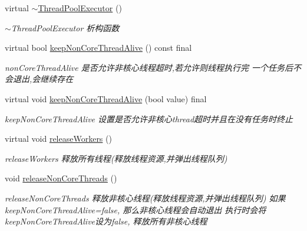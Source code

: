 \begin{DoxyCompactItemize}
\mbox{\label{classThreadPoolExecutor_a1d5a1c3330593f243959256d32068c15}} 
virtual \hyperlink{classThreadPoolExecutor_a1d5a1c3330593f243959256d32068c15}{$\sim$\+Thread\+Pool\+Executor} ()
\begin{DoxyCompactList}\small\item\em $\sim$\+Thread\+Pool\+Executor 析构函数 \end{DoxyCompactList}\item 
virtual bool \hyperlink{classThreadPoolExecutor_ac2aa11f7cde6e6082eb0dde8f2385dce}{keep\+Non\+Core\+Thread\+Alive} () const final
\begin{DoxyCompactList}\small\item\em non\+Core\+Thread\+Alive 是否允许非核心线程超时,若允许则线程执行完 一个任务后不会退出,会继续存在 \end{DoxyCompactList}\item 
virtual void \hyperlink{classThreadPoolExecutor_a7e6ed2d088147377d1e82018ac3dac1d}{keep\+Non\+Core\+Thread\+Alive} (bool value) final
\begin{DoxyCompactList}\small\item\em keep\+Non\+Core\+Thread\+Alive 设置是否允许非核心thread超时并且在没有任务时终止 \end{DoxyCompactList}\item 
\mbox{\label{classThreadPoolExecutor_a7d4bfa422c41a11fcdd33e7a1b2bcec8}} 
virtual void \hyperlink{classThreadPoolExecutor_a7d4bfa422c41a11fcdd33e7a1b2bcec8}{release\+Workers} ()
\begin{DoxyCompactList}\small\item\em release\+Workers 释放所有线程(释放线程资源,并弹出线程队列) \end{DoxyCompactList}\item 
\mbox{\label{classThreadPoolExecutor_abe693b22533251b638317683a7e8fa96}} 
void \hyperlink{classThreadPoolExecutor_abe693b22533251b638317683a7e8fa96}{release\+Non\+Core\+Threads} ()
\begin{DoxyCompactList}\small\item\em release\+Non\+Core\+Threads 释放非核心线程(释放线程资源,并弹出线程队列) 如果keep\+Non\+Core\+Thread\+Alive=false, 那么非核心线程会自动退出 执行时会将keep\+Non\+Core\+Thread\+Alive设为false, 释放所有非核心线程 \end{DoxyCompactList}\item 

\end{DoxyCompactItemize}
